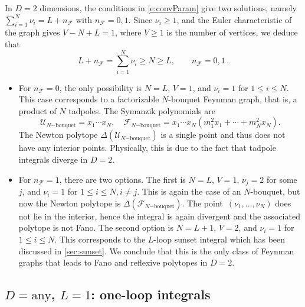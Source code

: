\documentclass[12pt,a4paper]{article}
\theoremstyle{plain}
\theoremstyle{remark}
\newcommand{\nprops}{N}
\newcommand{\cU}{\mathscr {U}}
\newcommand{\cF}{\mathscr {F}}
\newcommand{\Newton}{\Delta}
\begin{document}
      
		In $D=2$ dimensions, the conditions in \cref{e:convParam}
		give two
		solutions, namely $\sum_{i=1}^\nprops \nu_i=L+n_\cF$ with $n_\cF=0,1$. Since $\nu_i\geq1$,
		and the Euler characteristic of the graph gives $V-\nprops+L=1$, where
		$V\geq1$ is the number of vertices, we deduce that
		\begin{equation}
			L+n_\cF=\sum_{i=1}^\nprops \nu_i\geq \nprops \geq L, \qquad n_\cF=0,1  \, .
		\end{equation}
		\begin{itemize}
			\item For $n_\cF=0$, the only possibility is $\nprops = L$, $V = 1$, and $\nu_i=1$ for $1\leq i\leq \nprops$. 
			This case corresponds to a factorizable $\nprops$-bouquet Feynman graph, that is, a product of $\nprops$ tadpoles. The Symanzik polynomials are
			\begin{equation}
				\cU_{\nprops\mathrm{-bouquet}} = x_1\cdots x_\nprops,\quad \cF_{\nprops\mathrm{-bouquet}}=
				x_1\cdots x_\nprops\left(m_1^2x_1+\cdots +m_\nprops^2x_\nprops\right).
			\end{equation}
			The Newton polytope $\Newton(\cU_{\nprops\mathrm{-bouquet}})$ is a single point and thus does not have any interior points.
            Physically, this is due to the fact that tadpole integrals diverge in $D=2$.
            
			\item For $n_\cF=1$, there are two options.
            The first is $\nprops = L$, $V = 1$, $\nu_j = 2$ for some $j$, and $\nu_i = 1$ for $1 \le i \le \nprops, i \ne j$.
            This is again the case of an $\nprops$-bouquet, but now the Newton polytope is $\Newton(\cF_{\nprops\mathrm{-bouquet}})$.
            The point~$(\nu_1, \dots, \nu_\nprops)$ does not lie in the interior, hence the integral is again divergent and the associated polytope is not Fano.
            The second option is $\nprops = L+1$, $V = 2$, and $\nu_i = 1$ for $1 \le i \le \nprops$.
            This corresponds to the $L$-loop sunset integral which has been discussed in \cref{sec:sunset}.
            We conclude that this is the only class of Feynman graphs that leads to Fano and reflexive polytopes in $D=2$.
		\end{itemize}

\subsection{$D=\mathrm{any}$, $L = 1$: one-loop integrals}%
\label{sec:oneloop}
\end{document}

